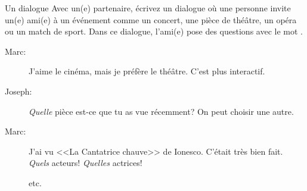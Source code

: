 \begin{frame}{Un dialogue}
  Avec un(e) partenaire, écrivez un dialogue où une personne invite un(e) ami(e) à un événement comme un concert, une pièce de théâtre, un opéra ou un match de sport.
  Dans ce dialogue, l'ami(e) pose des questions avec le mot .
  \begin{description}
    \item[Marc:] J'aime le cinéma, mais je préfère le théâtre. C'est plus interactif.
    \item[Joseph:] \emph{Quelle} pièce est-ce que tu as vue récemment? On peut choisir une autre.
    \item[Marc:] J'ai vu <<La Cantatrice chauve>> de Ionesco. C'était très bien fait. \emph{Quels} acteurs! \emph{Quelles} actrices!
    \item[] etc.
  \end{description}
\end{frame}